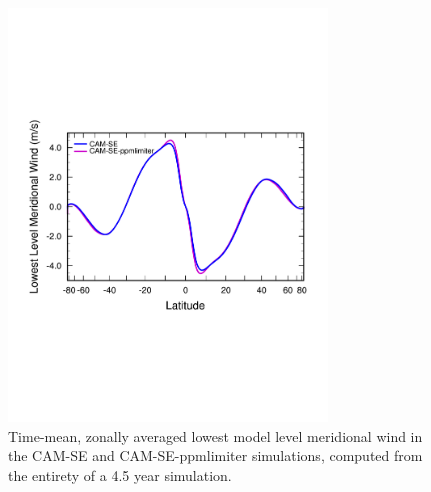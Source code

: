 \begin{figure}[h]
\centering
\includegraphics[width=20pc]{figs/zonal_v.pdf}
\caption{Time-mean, zonally averaged lowest model level meridional wind in the CAM-SE and CAM-SE-ppmlimiter simulations, computed from the entirety of a 4.5 year simulation.}
\label{fig:zonal_v}
\end{figure}

